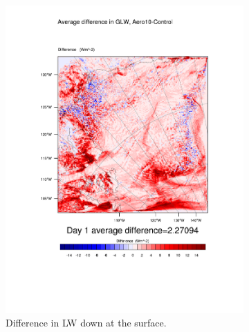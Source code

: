 \begin{figure}
	\begin{subfigure}{0.48\textwidth}
		\centering
		\includegraphics[width=\textwidth]{results/aero10/diff_Aero10_GLW_Day1.pdf}
		\caption{Difference in LW down at the surface.}
		\label{subfig:glw_r3Day1}
	\end{subfigure}
	\quad
	\begin{subfigure}{0.48\textwidth}
		\centering

\end{subfigure}
\end{figure}
